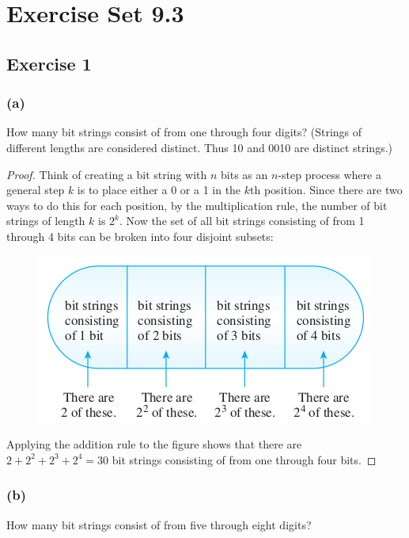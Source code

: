 \documentclass[14pt]{extarticle}
\begin{document}
\section{Exercise Set 9.3}

\subsection{Exercise 1}
\subsubsection{(a)}
How many bit strings consist of from one through four digits? (Strings of different lengths are considered
distinct. Thus 10 and 0010 are distinct strings.)

\begin{proof}
     Think of creating a bit string with $n$ bits as an $n$-step process where a general step $k$ is to place either a 0 or
     a 1 in the $k$th position. Since there are two ways to do this for each position, by the multiplication rule, the
     number of bit strings of length $k$ is $2^k$. Now the set of all bit strings consisting of from 1 through 4 bits can
     be broken into four disjoint subsets:

     \begin{figure}[ht!]
          \centering
          \includegraphics[scale=0.45]{../images/9.3.1.a.png}
     \end{figure}

     Applying the addition rule to the figure shows that there are \(2 + 2^2 + 2^3 + 2^4 = 30\) bit strings consisting of
     from one through four bits.
\end{proof}

\subsubsection{(b)}
How many bit strings consist of from five through eight digits?
\end{document}
